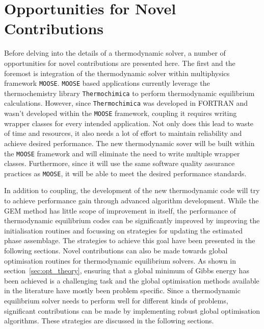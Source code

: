 \section{Opportunities for Novel Contributions}
Before delving into the details of a thermodynamic solver, a number of opportunities for novel contributions are presented here. The first and the foremost is integration of the thermodynamic solver within multiphysics framework \texttt{MOOSE}. \texttt{MOOSE} based applications currently leverage the thermochemistry library \texttt{Thermochimica} to perform thermodynamic equilibrium calculations. However, since \texttt{Thermochimica} was developed in FORTRAN and wasn't developed within the \texttt{MOOSE} framework, coupling it requires writing wrapper classes for every intended application. Not only does this lead to waste of time and resources, it also needs a lot of effort to maintain reliability and achieve desired performance. The new thermodynamic sover will be built within the \texttt{MOOSE} framework and will eliminate the need to write multiple wrapper classes. Furthermore, since it will use the same software quality assurance practices as \texttt{MOOSE}, it will be able to meet the desired performance standards.

	In addition to coupling, the development of the new thermodynamic code will try to achieve performance gain through advanced algorithm development. While the GEM method has little scope of improvement in itself, the performance of thermodynamic equilibrium codes can be significantly improved by improving the initialisation routines and focussing on strategies for updating the estimated phase assemblage. The strategies to achieve this goal have been presented in the following sections. Novel contributions can also be made towards global optimisation routines for thermodynamic equilibrium solvers. As shown in section~\ref{sec:opt_theory}, ensuring that a global minimum of Gibbs energy has been achieved is a challenging task and the global optimisation methods available in the literature have mostly been problem specific. Since a thermodynamic equilibrium solver needs to perform well for different kinds of problems, significant contributions can be made by implementing robust global optimisation algorithms. These strategies are discussed in the following sections.
		
